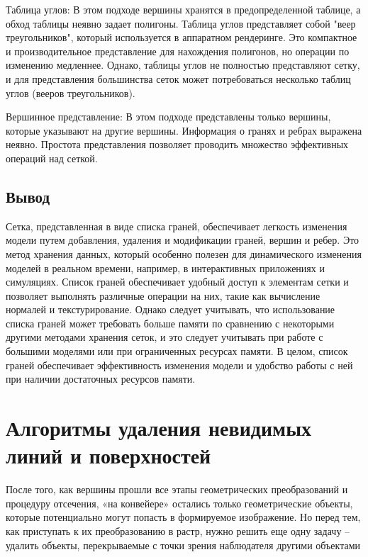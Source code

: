     Таблица углов: В этом подходе вершины хранятся в предопределенной таблице, а обход таблицы неявно задает полигоны. Таблица углов представляет собой "веер треугольников", который используется в аппаратном рендеринге. Это компактное и производительное представление для нахождения полигонов, но операции по изменению медленнее. Однако, таблицы углов не полностью представляют сетку, и для представления большинства сеток может потребоваться несколько таблиц углов (вееров треугольников).

    Вершинное представление: В этом подходе представлены только вершины, которые указывают на другие вершины. Информация о гранях и ребрах выражена неявно. Простота представления позволяет проводить множество эффективных операций над сеткой.



\subsection{Вывод}

Сетка, представленная в виде списка граней, обеспечивает легкость изменения модели путем добавления, удаления и модификации граней, вершин и ребер. Это метод хранения данных, который особенно полезен для динамического изменения моделей в реальном времени, например, в интерактивных приложениях и симуляциях. Список граней обеспечивает удобный доступ к элементам сетки и позволяет выполнять различные операции на них, такие как вычисление нормалей и текстурирование. Однако следует учитывать, что использование списка граней может требовать больше памяти по сравнению с некоторыми другими методами хранения сеток, и это следует учитывать при работе с большими моделями или при ограниченных ресурсах памяти. В целом, список граней обеспечивает эффективность изменения модели и удобство работы с ней при наличии достаточных ресурсов памяти.

\section{Алгоритмы удаления невидимых линий и поверхностей}

После того, как вершины прошли все этапы геометрических преобразований и процедуру
отсечения, «на конвейере» остались только геометрические объекты, которые потенциально могут
попасть в формируемое изображение. Но перед тем, как приступать к их преобразованию в растр,
нужно решить еще одну задачу – удалить объекты, перекрываемые с точки зрения наблюдателя
другими объектами 

